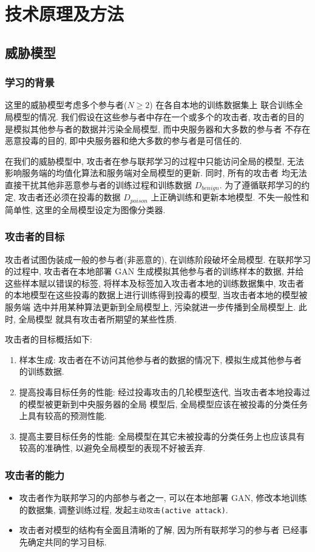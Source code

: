 \documentclass[../main.tex]{subfiles}
\begin{document}
\section{技术原理及方法}
\subsection{威胁模型}
\subsubsection{学习的背景}
这里的威胁模型考虑多个参与者($ N \geq 2 $) 在各自本地的训练数据集上
联合训练全局模型的情况. 我们假设在这些参与者中存在一个或多个的攻击者,
攻击者的目的是模拟其他参与者的数据并污染全局模型, 而中央服务器和大多数的参与者
不存在恶意投毒的目的, 即中央服务器和绝大多数的参与者是可信任的.

在我们的威胁模型中, 攻击者在参与联邦学习的过程中只能访问全局的模型,
无法影响服务端的均值化算法和服务端对全局模型的更新. 同时, 所有的攻击者
均无法直接干扰其他非恶意参与者的训练过程和训练数据 $ D_{benign} $.
为了遵循联邦学习的约定, 攻击者还必须在投毒的数据 $ D_{poison} $
上正确训练和更新本地模型. 不失一般性和简单性, 这里的全局模型设定为图像分类器.
%
\subsubsection{攻击者的目标}
攻击者试图伪装成一般的参与者(非恶意的), 在训练阶段破坏全局模型.
在联邦学习的过程中, 攻击者在本地部署 GAN 生成模拟其他参与者的训练样本的数据,
并给这些样本赋以错误的标签, 将样本及标签加入攻击者本地的训练数据集中, 攻击者
的本地模型在这些投毒的数据上进行训练得到投毒的模型, 当攻击者本地的模型被服务端
选中并用某种算法更新到全局模型上, 污染就进一步传播到全局模型上. 此时, 全局模型
就具有攻击者所期望的某些性质.

攻击者的目标概括如下:
\begin{enumerate}
  \item 样本生成: 攻击者在不访问其他参与者的数据的情况下, 模拟生成其他参与者
    的训练数据.
  \item 提高投毒目标任务的性能: 经过投毒攻击的几轮模型迭代, 当攻击者本地投毒过的模型被更新到中央服务器的全局
    模型后, 全局模型应该在被投毒的分类任务上具有较高的预测性能.
  \item 提高主要目标任务的性能: 全局模型在其它未被投毒的分类任务上也应该具有
    较高的准确性, 以避免全局模型的表现不好被丢弃.
\end{enumerate}
%
\subsubsection{攻击者的能力}
\begin{itemize}
  \item 攻击者作为联邦学习的内部参与者之一, 可以在本地部署 GAN,
    修改本地训练的数据集, 调整训练过程, 发起\texttt{主动攻击(active attack)}.
  \item 攻击者对模型的结构有全面且清晰的了解, 因为所有联邦学习的参与者
    已经事先确定共同的学习目标.
\end{itemize}
%
\end{document}
